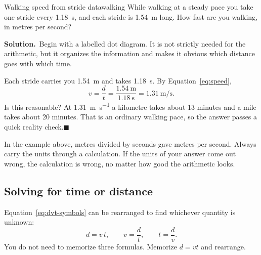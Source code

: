 \documentclass[11pt,twoside,openany]{book}
\newcounter{check}[chapter]
\newcommand{\solution}{\par\smallskip\noindent\textbf{Solution.}\ }
\newcommand{\qed}{\hfill$\blacksquare$}
\begin{document}
\begin{example}{Walking speed from stride data}{walking}
While walking at a steady pace you take one stride every \SI{1.18}{\second}, and each stride is \SI{1.54}{\metre} long. How fast are you walking, in metres per second?

\solution Begin with a labelled dot diagram. It is not strictly needed for the arithmetic, but it organizes the information and makes it obvious which distance goes with which time.

\begin{center}
\end{center}

Each stride carries you \SI{1.54}{\metre} and takes \SI{1.18}{\second}. By Equation~\eqref{eq:speed},
\[
v = \frac{d}{t} = \frac{\SI{1.54}{\metre}}{\SI{1.18}{\second}} = \SI{1.31}{\metre\per\second}.
\]
Is this reasonable? At \SI{1.31}{\metre\per\second} a kilometre takes about \num{13} minutes and a mile takes about \num{20} minutes. That is an ordinary walking pace, so the answer passes a quick reality check.\qed
\end{example}

\begin{keyidea}
In the example above, metres divided by seconds gave metres per second. Always carry the units through a calculation. If the units of your answer come out wrong, the calculation is wrong, no matter how good the arithmetic looks.
\end{keyidea}

\subsection{Solving for time or distance}

Equation~\eqref{eq:dvt-symbols} can be rearranged to find whichever quantity is unknown:
\[
d = v\,t, \qquad v = \frac{d}{t}, \qquad t = \frac{d}{v}.
\]
You do not need to memorize three formulas. Memorize $d = vt$ and rearrange.
\end{document}
